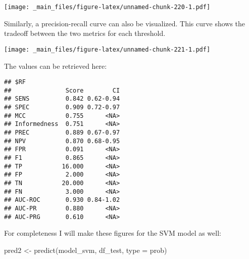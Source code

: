 \documentclass[
]{book}
\newenvironment{Shaded}{\begin{snugshade}}{\end{snugshade}}
\newcommand{\AttributeTok}[1]{\textcolor[rgb]{0.77,0.63,0.00}{#1}}
\newcommand{\ConstantTok}[1]{\textcolor[rgb]{0.00,0.00,0.00}{#1}}
\newcommand{\FunctionTok}[1]{\textcolor[rgb]{0.00,0.00,0.00}{#1}}
\newcommand{\NormalTok}[1]{#1}
\newcommand{\OtherTok}[1]{\textcolor[rgb]{0.56,0.35,0.01}{#1}}
\newcommand{\SpecialCharTok}[1]{\textcolor[rgb]{0.00,0.00,0.00}{#1}}
\newcommand{\StringTok}[1]{\textcolor[rgb]{0.31,0.60,0.02}{#1}}
\begin{document}
\texttt{[image: \_main\_files/figure-latex/unnamed-chunk-220-1.pdf]}

Similarly, a precision-recall curve can also be visualized. This curve shows the tradeoff between the two metrics for each threshold.

\begin{Shaded}
\end{Shaded}

\texttt{[image: \_main\_files/figure-latex/unnamed-chunk-221-1.pdf]}

The values can be retrieved here:

\begin{Shaded}
\end{Shaded}

\begin{verbatim}
## $RF
##               Score        CI
## SENS          0.842 0.62-0.94
## SPEC          0.909 0.72-0.97
## MCC           0.755      <NA>
## Informedness  0.751      <NA>
## PREC          0.889 0.67-0.97
## NPV           0.870 0.68-0.95
## FPR           0.091      <NA>
## F1            0.865      <NA>
## TP           16.000      <NA>
## FP            2.000      <NA>
## TN           20.000      <NA>
## FN            3.000      <NA>
## AUC-ROC       0.930 0.84-1.02
## AUC-PR        0.880      <NA>
## AUC-PRG       0.610      <NA>
\end{verbatim}

For completeness I will make these figures for the SVM model as well:

\begin{Shaded}
\begin{Highlighting}[]
\NormalTok{pred2 }\OtherTok{\textless{}{-}} \FunctionTok{predict}\NormalTok{(model\_svm, df\_test, }\AttributeTok{type =} \StringTok{\textquotesingle{}prob\textquotesingle{}}\NormalTok{)}
\end{Highlighting}
\end{Shaded}

\begin{Shaded}
\end{Shaded}
\end{document}
